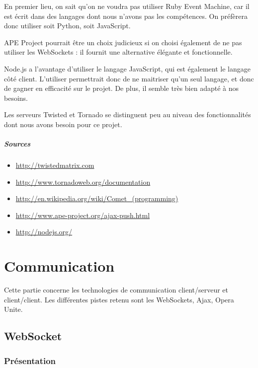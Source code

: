 \documentclass[a4paper,10pt]{report}
\begin{document}
En premier lieu, on sait qu'on ne voudra pas utiliser Ruby Event Machine, car il est écrit dans des langages dont nous n'avons pas les compétences. On préfèrera donc utiliser soit Python, soit JavaScript. 

APE Project pourrait être un choix judicieux si on choisi également de ne pas utiliser les WebSockets : il fournit une alternative élégante et fonctionnelle. 

Node.js a l'avantage d'utiliser le langage JavaScript, qui est également le langage côté client. L'utiliser permettrait donc de ne maitriser qu'un seul langage, et donc de gagner en efficacité sur le projet. De plus, il semble très bien adapté à nos besoins. 

Les serveurs Twisted et Tornado se distinguent peu au niveau des fonctionnalités dont nous avons besoin pour ce projet. 



  \paragraph{Sources}

    \begin{itemize}
    \item \url{http://twistedmatrix.com}
    \item \url{http://www.tornadoweb.org/documentation}
    \item \url{http://en.wikipedia.org/wiki/Comet_(programming)}
    \item \url{http://www.ape-project.org/ajax-push.html}
    \item \url{http://nodejs.org/}
    \end{itemize}




\chapter{Communication}

Cette partie concerne les technologies de communication client/serveur et 
client/client. Les différentes pistes retenu sont les WebSockets, Ajax, 
Opera Unite.

  \section{WebSocket}

    \subsection{Présentation}
\end{document}

